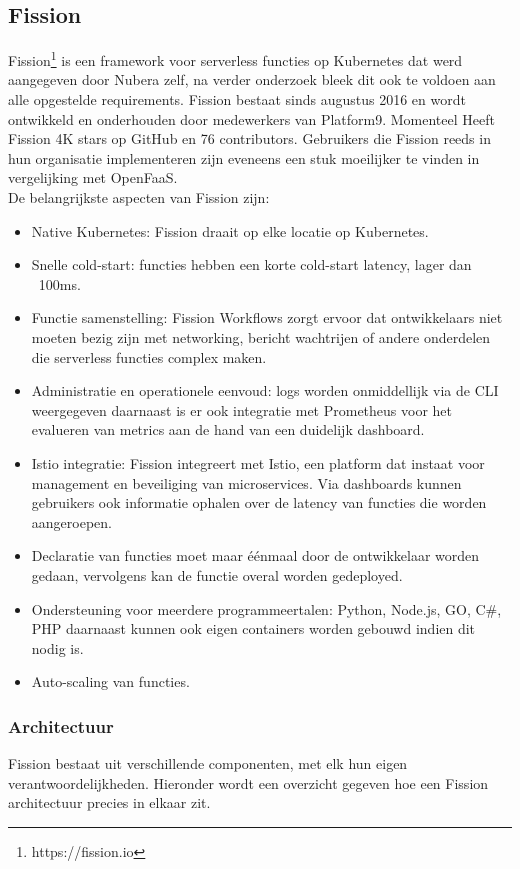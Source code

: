 \subsection{Fission}
Fission\footnote{https://fission.io} is een framework voor serverless functies op Kubernetes dat werd aangegeven door Nubera zelf, na verder onderzoek bleek dit ook te voldoen aan alle opgestelde requirements. Fission bestaat sinds augustus 2016 en wordt ontwikkeld en onderhouden door medewerkers van Platform9. Momenteel Heeft Fission 4K stars op GitHub en 76 contributors. Gebruikers die Fission reeds in hun organisatie implementeren zijn eveneens een stuk moeilijker te vinden in vergelijking met OpenFaaS.
\\
De  belangrijkste aspecten van Fission zijn:
\begin{itemize}
    \item Native Kubernetes: Fission draait op elke locatie op Kubernetes.
    \item Snelle cold-start: functies hebben een korte cold-start latency, lager dan ~100ms.
    \item Functie samenstelling: Fission Workflows zorgt ervoor dat ontwikkelaars niet moeten bezig zijn met networking, bericht wachtrijen of andere onderdelen die serverless functies complex maken.
    \item Administratie en operationele eenvoud: logs worden onmiddellijk via de CLI weergegeven daarnaast is er ook integratie met Prometheus voor het evalueren van metrics aan de hand van een duidelijk dashboard.
    \item Istio integratie: Fission integreert met Istio, een platform dat instaat voor management en beveiliging van microservices. Via dashboards kunnen gebruikers ook informatie ophalen over de latency van functies die worden aangeroepen.
    \item Declaratie van functies moet maar éénmaal door de ontwikkelaar worden gedaan, vervolgens kan de functie overal worden gedeployed.
    \item Ondersteuning voor meerdere programmeertalen: Python, Node.js, GO, C\#, PHP daarnaast kunnen ook eigen containers worden gebouwd indien dit nodig is. 
    \item Auto-scaling van functies. 
\end{itemize}

\subsubsection{Architectuur}
Fission bestaat uit verschillende componenten, met elk hun eigen verantwoordelijkheden. Hieronder wordt een overzicht gegeven hoe een Fission architectuur precies in elkaar zit. 

